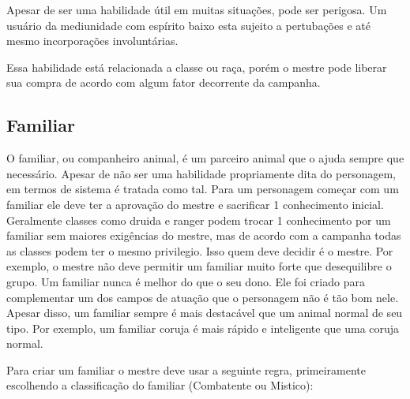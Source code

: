 Apesar de ser uma habilidade útil em muitas situações, pode ser perigosa. Um usuário da mediunidade com espírito baixo esta sujeito a pertubações e até mesmo incorporações involuntárias.

Essa habilidade está relacionada a classe ou raça, porém o mestre pode liberar sua compra de acordo com algum fator decorrente da campanha. 

\subsection{Familiar}
O familiar, ou companheiro animal, é um parceiro animal que o ajuda sempre que necessário. Apesar de não ser uma habilidade propriamente dita do personagem, em termos de sistema é tratada como tal. Para um personagem começar com um familiar ele deve ter a aprovação do mestre e sacrificar 1 conhecimento inicial. Geralmente classes como druida e ranger podem trocar 1 conhecimento por um familiar sem maiores exigências do mestre, mas de acordo com a campanha todas as classes podem ter o mesmo privilegio. Isso quem deve decidir é o mestre. Por exemplo, o mestre não deve permitir um familiar muito forte que desequilibre o grupo. Um familiar nunca é melhor do que o seu dono. Ele foi criado para complementar um dos campos de atuação que o personagem não é tão bom nele. Apesar disso, um familiar sempre é mais destacável que um animal normal de seu tipo. Por exemplo, um familiar coruja é mais rápido e inteligente que uma coruja normal.

Para criar um familiar o mestre deve usar a seguinte regra, primeiramente escolhendo a classificação do familiar (Combatente ou Mistico):

